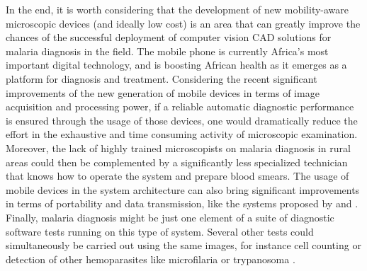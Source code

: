 \documentclass[sensors,review,submit,moreauthors,pdftex,10pt,a4paper]{mdpi}
\begin{document}
In the end, it is worth considering that the development of new mobility-aware microscopic devices (and ideally low cost) is an area that can greatly improve the chances of the successful deployment of computer vision CAD solutions for malaria diagnosis in the field.
The mobile phone is currently Africa's most important digital technology, and is boosting African health as it emerges as a platform for diagnosis and treatment.
Considering the recent significant improvements of the new generation of mobile devices in terms of image acquisition and processing power, if a reliable automatic diagnostic performance is ensured through the usage of those devices, one would dramatically reduce the effort in the exhaustive and time consuming activity of microscopic examination.
Moreover, the lack of highly trained microscopists on malaria diagnosis in rural areas could then be complemented by a significantly less specialized technician that knows how to operate the system and prepare blood smears. The usage of mobile devices in the system architecture can also bring significant improvements in terms of portability and data transmission, like the systems proposed by \cite{Oliveira2017} and \cite{Rosado2017}. 
Finally, malaria diagnosis might be just one element of a suite of diagnostic software tests running on this type of system. Several other tests could simultaneously be carried out using the same images, for instance cell counting or detection of other hemoparasites like microfilaria or trypanosoma \cite{Rosado2016}.




\vspace{6pt} 



\end{document}
